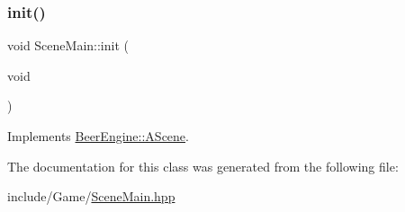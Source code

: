 \subsubsection{\texorpdfstring{init()}{init()}}
{\footnotesize\ttfamily void Scene\+Main\+::init (\begin{DoxyParamCaption}\item[{void}]{ }\end{DoxyParamCaption})\hspace{0.3cm}{\ttfamily [virtual]}}



Implements \mbox{\hyperlink{class_beer_engine_1_1_a_scene_a7a55b4e506ae618e6596ae812ad48db0}{Beer\+Engine\+::\+A\+Scene}}.



The documentation for this class was generated from the following file\+:\begin{DoxyCompactItemize}
\item 
include/\+Game/\mbox{\hyperlink{_scene_main_8hpp}{Scene\+Main.\+hpp}}\end{DoxyCompactItemize}
